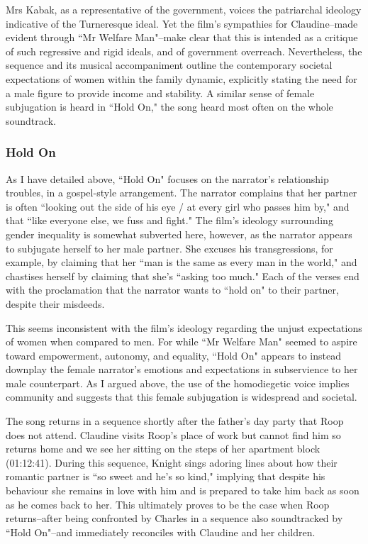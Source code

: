 Mrs Kabak, as a representative of the government, voices the patriarchal ideology indicative of the Turneresque ideal.
Yet the film's sympathies for Claudine–made evident through ``Mr Welfare Man"–make clear that this is intended as a critique of such regressive and rigid ideals, and of government overreach.
Nevertheless, the sequence and its musical accompaniment outline the contemporary societal expectations of women within the family dynamic, explicitly stating the need for a male figure to provide income and stability.
A similar sense of female subjugation is heard in ``Hold On," the song heard most often on the whole soundtrack.



\subsubsection{Hold On}


As I have detailed above, ``Hold On" focuses on the narrator's relationship troubles, in a gospel-style arrangement.
The narrator complains that her partner is often ``looking out the side of his eye / at every girl who passes him by," and that ``like everyone else, we fuss and fight."
The film's ideology surrounding gender inequality is somewhat subverted here, however, as the narrator appears to subjugate herself to her male partner.
She excuses his transgressions, for example, by claiming that her ``man is the same as every man in the world," and chastises herself by claiming that she's ``asking too much."
Each of the verses end with the proclamation that the narrator wants to ``hold on" to their partner, despite their misdeeds.

This seems inconsistent with the film's ideology regarding the unjust expectations of women when compared to men.
For while ``Mr Welfare Man" seemed to aspire toward empowerment, autonomy, and equality, ``Hold On" appears to instead downplay the female narrator's emotions and expectations in subservience to her male counterpart.
As I argued above, the use of the homodiegetic voice implies community and suggests that this female subjugation is widespread and societal.


The song returns in a sequence shortly after the father's day party that Roop does not attend.
Claudine visits Roop's place of work but cannot find him so returns home and we see her sitting on the steps of her apartment block (01:12:41).
During this sequence, Knight sings adoring lines about how their romantic partner is ``so sweet and he's so kind," implying that despite his behaviour she remains in love with him and is prepared to take him back as soon as he comes back to her.
This ultimately proves to be the case when Roop returns–after being confronted by Charles in a sequence also soundtracked by ``Hold On"–and immediately reconciles with Claudine and her children.



